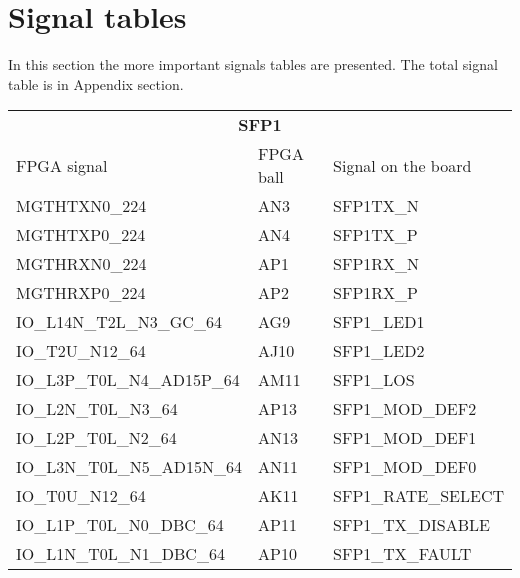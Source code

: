 \section{Signal tables}
In this section the more important signals tables are presented. The total signal table is in Appendix section.\\
\begin{footnotesize}
	\begin{longtable}{|p{7cm}|p{1cm}|p{5cm}|}
	\hline
	\multicolumn{3}{|c|}{\multirow{2}{*}{\textbf{\large{SFP1}}}}\\
	\multicolumn{3}{|c|}{} \\ \hline
FPGA signal	&	FPGA ball	&	Signal on the board	\\ \hline 
MGTHTXN0\_224	&	AN3	&	SFP1TX\_N	\\ \hline
MGTHTXP0\_224	&	AN4	&	SFP1TX\_P	\\ \hline
MGTHRXN0\_224	&	AP1	&	SFP1RX\_N	\\ \hline
MGTHRXP0\_224	&	AP2	&	SFP1RX\_P	\\ \hline
IO\_L14N\_T2L\_N3\_GC\_64	&	AG9	&	SFP1\_LED1	\\ \hline
IO\_T2U\_N12\_64	&	AJ10	&	SFP1\_LED2	\\ \hline
IO\_L3P\_T0L\_N4\_AD15P\_64	&	AM11	&	SFP1\_LOS	\\ \hline
IO\_L2N\_T0L\_N3\_64	&	AP13	&	SFP1\_MOD\_DEF2	\\ \hline
IO\_L2P\_T0L\_N2\_64	&	AN13	&	SFP1\_MOD\_DEF1	\\ \hline
IO\_L3N\_T0L\_N5\_AD15N\_64	&	AN11	&	SFP1\_MOD\_DEF0	\\ \hline
IO\_T0U\_N12\_64	&	AK11	&	SFP1\_RATE\_SELECT	\\ \hline
IO\_L1P\_T0L\_N0\_DBC\_64	&	AP11	&	SFP1\_TX\_DISABLE	\\ \hline
IO\_L1N\_T0L\_N1\_DBC\_64	&	AP10	&	SFP1\_TX\_FAULT	\\ \hline
	

		
	\end{longtable}
\end{footnotesize}

